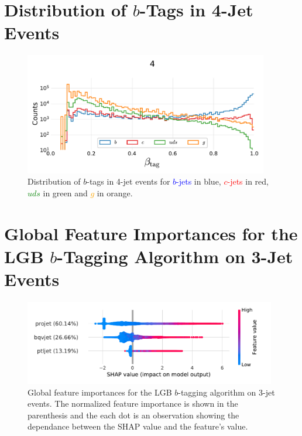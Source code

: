 \section[Distribution of b-Tags in 4-Jet Events]{Distribution of $b$-Tags in 4-Jet Events}
\begin{figure}[h!]
    \centerfloat
    \includegraphics[width=0.95\textwidth, trim=15 15 15 50, clip]{figures/quarks/btag_scores_histogram_-njet=4-down_sample=1.00-ML_vars=vertex-selection=b-ejet_min=4-n_iter_RS_lgb=99-n_iter_RS_xgb=9-cdot_cut=0.90-version=19.pdf}
    \caption[Distribution of $b$-Tags in 4-Jet Events]
            {Distribution of $b$-tags in 4-jet events for \textcolor{blue}{$b$-jets} in blue, \textcolor{red}{$c$-jets} in red, \textcolor{green}{$uds$} in green and \textcolor{orange}{$g$} in orange.} 
\end{figure}
\clearpage


\FloatBarrier
\section[Global Feature Importances for the LGB b-Tagging Algorithm on 3-Jet Events]{Global Feature Importances for the LGB $b$-Tagging Algorithm on 3-Jet Events}
\begin{figure}[h!]
  \includegraphics[width=0.98\textwidth, trim=10 10 20 10, clip]{figures/quarks/shap_global-down_sample=1.00-ML_vars=vertex-selection=b-ejet_min=4-n_iter_RS_lgb=99-n_iter_RS_xgb=9-cdot_cut=0.90-version=19-njet=3.pdf}
  \caption[Global Feature Importances for the LGB $b$-Tagging Algorithm on 3-Jet Events]
          {Global feature importances for the LGB $b$-tagging algorithm on 3-jet events. The normalized feature importance is shown in the parenthesis and the each dot is an observation showing the dependance between the SHAP value and the feature's value. 
          } 
  \label{fig:q:shap_btag_global_3j}
\end{figure}
\vspace{3cm}
